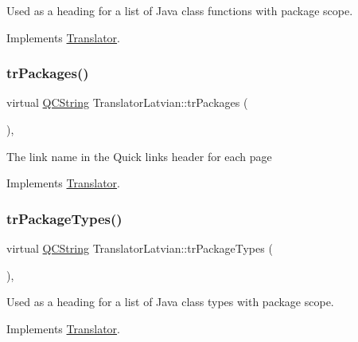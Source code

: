 Used as a heading for a list of Java class functions with package scope. 

Implements \mbox{\hyperlink{class_translator}{Translator}}.

\mbox{\label{class_translator_latvian_a1fbaa5241a205d860272f239b6d415cd}} 
\subsubsection{\texorpdfstring{trPackages()}{trPackages()}}
{\footnotesize\ttfamily virtual \mbox{\hyperlink{class_q_c_string}{Q\+C\+String}} Translator\+Latvian\+::tr\+Packages (\begin{DoxyParamCaption}{ }\end{DoxyParamCaption})\hspace{0.3cm}{\ttfamily [inline]}, {\ttfamily [virtual]}}

The link name in the Quick links header for each page 

Implements \mbox{\hyperlink{class_translator}{Translator}}.

\mbox{\label{class_translator_latvian_a982f6c35348f2aac06c5ca9620465571}} 
\subsubsection{\texorpdfstring{trPackageTypes()}{trPackageTypes()}}
{\footnotesize\ttfamily virtual \mbox{\hyperlink{class_q_c_string}{Q\+C\+String}} Translator\+Latvian\+::tr\+Package\+Types (\begin{DoxyParamCaption}{ }\end{DoxyParamCaption})\hspace{0.3cm}{\ttfamily [inline]}, {\ttfamily [virtual]}}

Used as a heading for a list of Java class types with package scope. 

Implements \mbox{\hyperlink{class_translator}{Translator}}.

\mbox{\label{class_translator_latvian_adf124d405da5473cc5adb4af0e2ed0b2}} 

